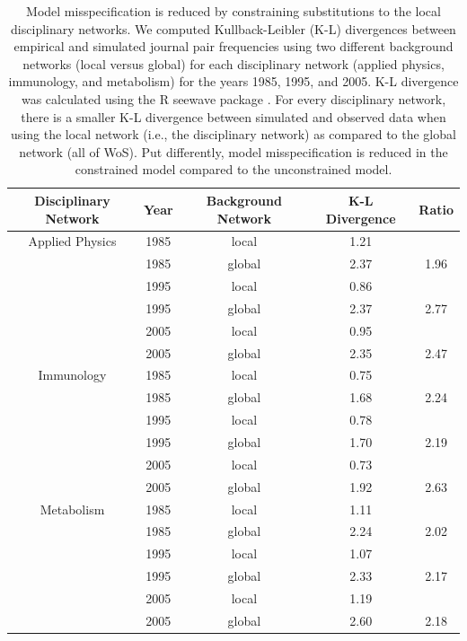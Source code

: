 \documentclass[NETN]{stjour}
\begin{document}
\begin{table}[ht]
\caption{Model misspecification is reduced by constraining substitutions to the local  disciplinary networks. 
We computed 
Kullback-Leibler (K-L) divergences
between empirical and simulated journal pair frequencies using two different
background networks (local versus global) for each disciplinary network  (applied physics, immunology, and metabolism)
for the years 1985, 1995, and 2005.
K-L divergence was calculated using the R seewave package \citep{seewave2008}.  
For every disciplinary network, there is a smaller K-L divergence between simulated and observed data
when using the local network (i.e., the disciplinary network) as compared to the global network (all of WoS). 
Put differently, 
model misspecification is reduced in the constrained model compared to the unconstrained model.
}
\label{tab:kld}
\centering
\begin{tabular}{| ccccc |} 
  \hline
 Disciplinary Network & Year & Background Network & K-L Divergence & Ratio \\ 
  \hline
Applied Physics & 1985 & local & 1.21 &  \\ 
  & 1985 & global & 2.37 & 1.96 \\ 
  & 1995 & local & 0.86 &  \\ 
  & 1995 & global  & 2.37 & 2.77 \\ 
  & 2005 & local & 0.95 &  \\ 
  & 2005 & global  & 2.35 & 2.47 \\ 
    \hline
Immunology & 1985 & local & 0.75 &  \\ 
  & 1985 & global  & 1.68 & 2.24 \\ 
   & 1995 & local & 0.78 &  \\ 
   & 1995 & global  & 1.70 & 2.19 \\ 
   & 2005 & local & 0.73 &  \\ 
  & 2005 & global  & 1.92 & 2.63 \\ 
    \hline
Metabolism & 1985 & local & 1.11 &  \\ 
   & 1985 & global  & 2.24 & 2.02 \\ 
  & 1995 & local & 1.07 &  \\ 
  & 1995 & global  & 2.33 & 2.17 \\ 
     & 2005 & local & 1.19 &  \\ 
   & 2005 & global  & 2.60 & 2.18 \\ 
   \hline
\end{tabular}
\end{table}
\end{document}
